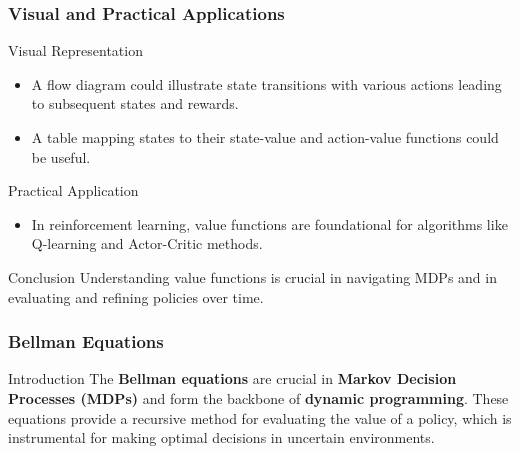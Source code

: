 \documentclass[aspectratio=169]{beamer}
\begin{document}
\begin{frame}[fragile]
    \frametitle{Visual and Practical Applications}
    \begin{block}{Visual Representation}
        \begin{itemize}
            \item A flow diagram could illustrate state transitions with various actions leading to subsequent states and rewards.
            \item A table mapping states to their state-value and action-value functions could be useful.
        \end{itemize}
    \end{block}

    \begin{block}{Practical Application}
        \begin{itemize}
            \item In reinforcement learning, value functions are foundational for algorithms like Q-learning and Actor-Critic methods.
        \end{itemize}
    \end{block}
    
    \begin{block}{Conclusion}
        Understanding value functions is crucial in navigating MDPs and in evaluating and refining policies over time.
    \end{block}
\end{frame}

\begin{frame}[fragile]
    \frametitle{Bellman Equations}
    \begin{block}{Introduction}
        The \textbf{Bellman equations} are crucial in \textbf{Markov Decision Processes (MDPs)} and form the backbone of \textbf{dynamic programming}. These equations provide a recursive method for evaluating the value of a policy, which is instrumental for making optimal decisions in uncertain environments.
    \end{block}
\end{frame}
\end{document}
